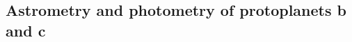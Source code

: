 \documentclass[longauth]{aa}
\begin{document}

\subsection[Astrometry and photometry of protoplanets b and c]{Astrometry and photometry of protoplanets {\sf b} and {\sf c}}\label{sec:photometry}
\end{document}
